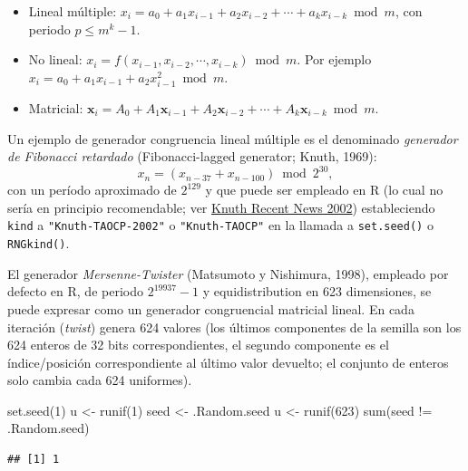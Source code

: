 \documentclass[
]{book}
\newenvironment{Shaded}{\begin{snugshade}}{\end{snugshade}}
\newcommand{\DecValTok}[1]{\textcolor[rgb]{0.00,0.00,0.81}{#1}}
\newcommand{\FunctionTok}[1]{\textcolor[rgb]{0.00,0.00,0.00}{#1}}
\newcommand{\NormalTok}[1]{#1}
\newcommand{\OtherTok}[1]{\textcolor[rgb]{0.56,0.35,0.01}{#1}}
\newcommand{\SpecialCharTok}[1]{\textcolor[rgb]{0.00,0.00,0.00}{#1}}
\theoremstyle{break}
\theoremstyle{definition}
\theoremstyle{definition}
\theoremstyle{definition}
\theoremstyle{definition}
\theoremstyle{remark}
\begin{document}
\begin{itemize}
\item
  Lineal múltiple:
  \(x_{i}= a_0 + a_1 x_{i-1} + a_2 x_{i-2} + \cdots + a_{k} x_{i-k} \bmod m\),
  con periodo \(p\leq m^{k}-1\).
\item
  No lineal:
  \(x_{i} = f\left( x_{i-1}, x_{i-2}, \cdots, x_{i-k} \right) \bmod m\).
  Por ejemplo \(x_{i} = a_0 + a_1 x_{i-1} + a_2 x_{i-1}^2 \bmod m\).
\item
  Matricial:
  \(\boldsymbol{x}_{i} = A_0 + A_1\boldsymbol{x}_{i-1} + A_2\boldsymbol{x}_{i-2} + \cdots + A_{k}\boldsymbol{x}_{i-k} \bmod m\).
\end{itemize}

Un ejemplo de generador congruencia lineal múltiple es el denominado \emph{generador de Fibonacci retardado} (Fibonacci-lagged generator; Knuth, 1969):
\[x_n = (x_{n-37} + x_{n-100}) \bmod 2^{30},\]
con un período aproximado de \(2^{129}\) y que puede ser empleado en R (lo cual no sería en principio recomendable; ver \href{https://www-cs-faculty.stanford.edu/~knuth/news02.html\#rng}{Knuth Recent News 2002}) estableciendo \texttt{kind} a \texttt{"Knuth-TAOCP-2002"} o \texttt{"Knuth-TAOCP"} en la llamada a \texttt{set.seed()} o \texttt{RNGkind()}.

El generador \emph{Mersenne-Twister} (Matsumoto y Nishimura, 1998), empleado por defecto en R, de periodo \(2^{19937}-1\) y equidistribution en 623 dimensiones, se puede expresar como un generador congruencial matricial lineal.
En cada iteración (\emph{twist}) genera 624 valores (los últimos componentes de la semilla son los 624 enteros de 32 bits correspondientes, el segundo componente es el índice/posición correspondiente al último valor devuelto; el conjunto de enteros solo cambia cada 624 uniformes).

\begin{Shaded}
\begin{Highlighting}[]
\FunctionTok{set.seed}\NormalTok{(}\DecValTok{1}\NormalTok{)}
\NormalTok{u }\OtherTok{\textless{}{-}} \FunctionTok{runif}\NormalTok{(}\DecValTok{1}\NormalTok{)}
\NormalTok{seed }\OtherTok{\textless{}{-}}\NormalTok{ .Random.seed}
\NormalTok{u }\OtherTok{\textless{}{-}} \FunctionTok{runif}\NormalTok{(}\DecValTok{623}\NormalTok{)}
\FunctionTok{sum}\NormalTok{(seed }\SpecialCharTok{!=}\NormalTok{ .Random.seed) }
\end{Highlighting}
\end{Shaded}

\begin{verbatim}
## [1] 1
\end{verbatim}
\end{document}
